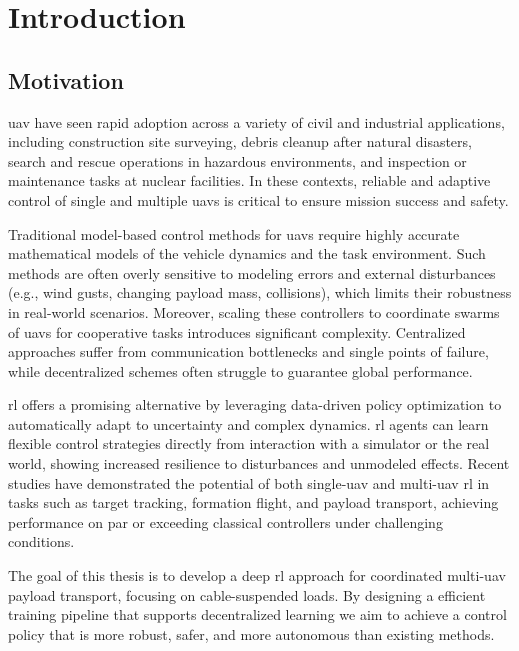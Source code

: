 \chapter{Introduction}
\section{Motivation}
\gls{uav} have seen rapid adoption across a variety of civil and industrial applications, including construction site surveying, debris cleanup after natural disasters, search and rescue operations in hazardous environments, and inspection or maintenance tasks at nuclear facilities. In these contexts, reliable and adaptive control of single and multiple \gls{uav}s is critical to ensure mission success and safety.

Traditional model-based control methods for \gls{uav}s require highly accurate mathematical models of the vehicle dynamics and the task environment. Such methods are often overly sensitive to modeling errors and external disturbances (e.g., wind gusts, changing payload mass, collisions), which limits their robustness in real-world scenarios. Moreover, scaling these controllers to coordinate swarms of \gls{uav}s for cooperative tasks introduces significant complexity. Centralized approaches suffer from communication bottlenecks and single points of failure, while decentralized schemes often struggle to guarantee global performance.

\gls{rl} offers a promising alternative by leveraging data-driven policy optimization to automatically adapt to uncertainty and complex dynamics. \gls{rl} agents can learn flexible control strategies directly from interaction with a simulator or the real world, showing increased resilience to disturbances and unmodeled effects. Recent studies have demonstrated the potential of both single-\gls{uav} and multi-\gls{uav} \gls{rl} in tasks such as target tracking, formation flight, and payload transport, achieving performance on par or exceeding classical controllers under challenging conditions.

The goal of this thesis is to develop a deep \gls{rl} approach for coordinated multi-\gls{uav} payload transport, focusing on cable-suspended loads. By designing a efficient training pipeline that supports decentralized learning we aim to achieve a control policy that is more robust, safer, and more autonomous than existing methods.

